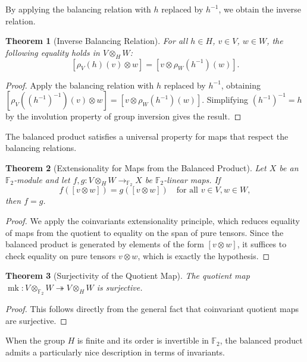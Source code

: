 \documentclass[11pt]{article}
\theoremstyle{plain}
\newtheorem*{theorem}{Theorem}
\theoremstyle{definition}
\theoremstyle{remark}
\begin{document}
By applying the balancing relation with $h$ replaced by $h^{-1}$, we obtain the inverse relation.

\begin{theorem}[Inverse Balancing Relation]
For all $h \in H$, $v \in V$, $w \in W$, the following equality holds in $V \otimes_H W$:
\[
[\rho_V(h)(v) \otimes w] = [v \otimes \rho_W(h^{-1})(w)].
\]
\end{theorem}

\begin{proof}
Apply the balancing relation with $h$ replaced by $h^{-1}$, obtaining $[\rho_V((h^{-1})^{-1})(v) \otimes w] = [v \otimes \rho_W(h^{-1})(w)]$. Simplifying $(h^{-1})^{-1} = h$ by the involution property of group inversion gives the result.
\end{proof}

The balanced product satisfies a universal property for maps that respect the balancing relations.

\begin{theorem}[Extensionality for Maps from the Balanced Product]
Let $X$ be an $\mathbb{F}_2$-module and let $f, g : V \otimes_H W \to_{\mathbb{F}_2} X$ be $\mathbb{F}_2$-linear maps. If
\[
f([v \otimes w]) = g([v \otimes w]) \quad \text{for all } v \in V, w \in W,
\]
then $f = g$.
\end{theorem}

\begin{proof}
We apply the coinvariants extensionality principle, which reduces equality of maps from the quotient to equality on the span of pure tensors. Since the balanced product is generated by elements of the form $[v \otimes w]$, it suffices to check equality on pure tensors $v \otimes w$, which is exactly the hypothesis.
\end{proof}

\begin{theorem}[Surjectivity of the Quotient Map]
The quotient map $\operatorname{mk} : V \otimes_{\mathbb{F}_2} W \twoheadrightarrow V \otimes_H W$ is surjective.
\end{theorem}

\begin{proof}
This follows directly from the general fact that coinvariant quotient maps are surjective.
\end{proof}

When the group $H$ is finite and its order is invertible in $\mathbb{F}_2$, the balanced product admits a particularly nice description in terms of invariants.
\end{document}
